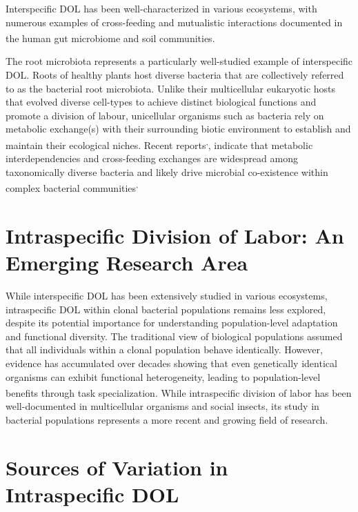 \documentclass[
  11pt,
  a4paper,
]{report}
\begin{document}
Interspecific DOL has been well-characterized in various ecosystems,
with numerous examples of cross-feeding and mutualistic interactions
documented in the human gut microbiome and soil
communities\textsuperscript{}.

The root microbiota represents a particularly well-studied example of
interspecific DOL. Roots of healthy plants host diverse bacteria that
are collectively referred to as the bacterial root microbiota. Unlike
their multicellular eukaryotic hosts that evolved diverse cell-types to
achieve distinct biological functions and promote a division of labour,
unicellular organisms such as bacteria rely on metabolic exchange(s)
with their surrounding biotic environment to establish and maintain
their ecological niches. Recent
reports\textsuperscript{,},
indicate that metabolic interdependencies and cross-feeding exchanges
are widespread among taxonomically diverse bacteria and likely drive
microbial co-existence within complex bacterial
communities\textsuperscript{,}

\section{Intraspecific Division of Labor: An Emerging Research
Area}\label{intraspecific-division-of-labor-an-emerging-research-area}

While interspecific DOL has been extensively studied in various
ecosystems, intraspecific DOL within clonal bacterial populations
remains less explored, despite its potential importance for
understanding population-level adaptation and functional diversity. The
traditional view of biological populations assumed that all individuals
within a clonal population behave identically. However, evidence has
accumulated over decades showing that even genetically identical
organisms can exhibit functional heterogeneity, leading to
population-level benefits through task
specialization\textsuperscript{}.
While intraspecific division of labor has been well-documented in
multicellular organisms and social insects, its study in bacterial
populations represents a more recent and growing field of research.

\section{Sources of Variation in Intraspecific
DOL}\label{sources-of-variation-in-intraspecific-dol}
\end{document}
